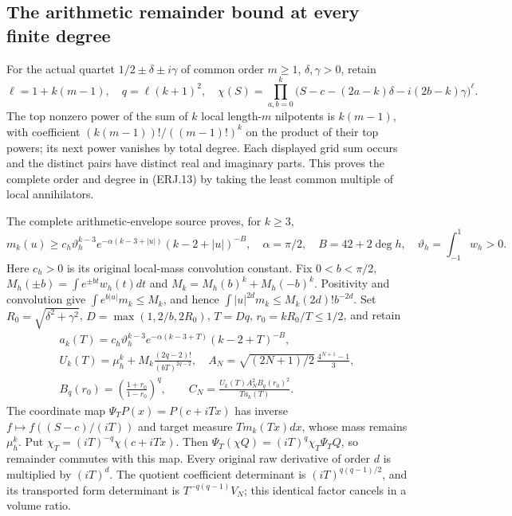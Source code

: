 \subsection{The arithmetic remainder bound at every finite degree}
For the actual quartet $1/2\pm\delta\pm i\gamma$ of common order
$m\ge1$, $\delta,\gamma>0$, retain
\[
 \ell=1+k(m-1),\quad q=\ell(k+1)^2,\quad
 \chi(S)=\prod_{a,b=0}^k
 \bigl(S-c-(2a-k)\delta-i(2b-k)\gamma\bigr)^\ell.
 \tag{ERJ.13}
\]
The top nonzero power of the sum of $k$ local length-$m$ nilpotents
is $k(m-1)$, with coefficient $(k(m-1))!/((m-1)!)^k$ on the product
of their top powers; its next power vanishes by total degree. Each
displayed grid sum occurs and the distinct pairs have distinct real
and imaginary parts. This proves the complete order and degree in
(ERJ.13) by taking the least common multiple of local annihilators.

The complete arithmetic-envelope source proves, for $k\ge3$,
\[
 m_k(u)\ge c_h\vartheta_h^{k-3}
 e^{-\alpha(k-3+|u|)}(k-2+|u|)^{-B},\quad
 \alpha=\pi/2,\quad B=42+2\deg h,\quad
 \vartheta_h=\int_{-1}^1w_h>0.\tag{ERJ.14}
\]
Here $c_h>0$ is its original local-mass convolution constant.
Fix $0<b<\pi/2$, $M_h(\pm b)=\int e^{\pm bt}w_h(t)dt$ and
$M_k=M_h(b)^k+M_h(-b)^k$. Positivity and convolution give
$\int e^{b|u|}m_k\le M_k$, and hence
$\int |u|^{2d}m_k\le M_k(2d)!b^{-2d}$.
Set $R_0=\sqrt{\delta^2+\gamma^2}$, $D=\max(1,2/b,2R_0)$,
$T=Dq$, $r_0=kR_0/T\le1/2$, and retain
\[
\begin{gathered}
 a_k(T)=c_h\vartheta_h^{k-3}e^{-\alpha(k-3+T)}(k-2+T)^{-B},\\
 U_k(T)=\mu_h^k+M_k\frac{(2q-2)!}{(bT)^{2q-2}},\quad
 A_N=\sqrt{(2N+1)/2}\,\frac{4^{N+1}-1}{3},\\
 B_q(r_0)=\left(\frac{1+r_0}{1-r_0}\right)^q,\qquad
 C_N=\frac{U_k(T)A_N^2B_q(r_0)^2}{T a_k(T)}.
\end{gathered}\tag{ERJ.15}
\]
The coordinate map $\Psi_TP(x)=P(c+iTx)$ has inverse
$f\mapsto f((S-c)/(iT))$ and target measure $T m_k(Tx)dx$,
whose mass remains $\mu_h^k$. Put
$\chi_T=(iT)^{-q}\chi(c+iTx)$. Then
$\Psi_T(\chi Q)=(iT)^q\chi_T\Psi_TQ$, so remainder commutes
with this map. Every original raw derivative of order $d$ is multiplied
by $(iT)^d$. The quotient coefficient determinant is
$(iT)^{q(q-1)/2}$, and its transported form determinant is
$T^{-q(q-1)}V_N$; this identical factor cancels in a volume ratio.

